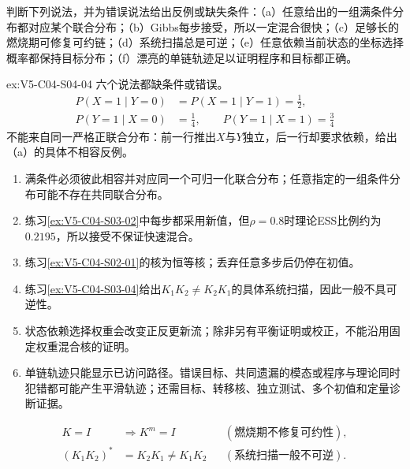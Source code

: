 \begin{SLChapterExercisePairSection}
\begin{exercise}\label{ex:V5-C04-S04-04}
判断下列说法，并为错误说法给出反例或缺失条件：（a）任意给出的一组满条件分布都对应某个联合分布；（b）Gibbs每步接受，所以一定混合很快；（c）足够长的燃烧期可修复可约链；（d）系统扫描总是可逆；（e）任意依赖当前状态的坐标选择概率都保持目标分布；（f）漂亮的单链轨迹足以证明程序和目标都正确。
\end{exercise}
\ifSLFullEdition
{}\label{sol:V5-C04-S04-04}
\begin{chapterexercisesolution}{ex:V5-C04-S04-04}
六个说法都缺条件或错误。
\[
\begin{aligned}
P(X=1\mid Y=0)&=P(X=1\mid Y=1)=\frac12,\\
P(Y=1\mid X=0)&=\frac14,\qquad
P(Y=1\mid X=1)=\frac34
\end{aligned}
\]
不能来自同一严格正联合分布：前一行推出$X$与$Y$独立，后一行却要求依赖，给出（a）的具体不相容反例。
\begin{enumerate}[label=(\alph{enumi}),leftmargin=2.4em]
  \item 满条件必须彼此相容并对应同一个可归一化联合分布；任意指定的一组条件分布可能不存在共同联合分布。
  \item 练习\ref{ex:V5-C04-S03-02}中每步都采用新值，但$\rho=0.8$时理论ESS比例约为$0.2195$，所以接受不保证快速混合。
  \item 练习\ref{ex:V5-C04-S02-01}的核为恒等核；丢弃任意多步后仍停在初值。
  \item 练习\ref{ex:V5-C04-S03-04}给出$K_1K_2\ne K_2K_1$的具体系统扫描，因此一般不具可逆性。
  \item 状态依赖选择权重会改变正反更新流；除非另有平衡证明或校正，不能沿用固定权重混合核的证明。
  \item 单链轨迹只能显示已访问路径。错误目标、共同遗漏的模态或程序与理论同时犯错都可能产生平滑轨迹；还需目标、转移核、独立测试、多个初值和定量诊断证据。
\end{enumerate}
\[
\begin{aligned}
K=I&\Longrightarrow K^m=I
  &&(\text{燃烧期不修复可约性}),\\
(K_1K_2)^*&=K_2K_1\ne K_1K_2
  &&(\text{系统扫描一般不可逆}).
\end{aligned}
\]
\end{chapterexercisesolution}
\fi

\end{SLChapterExercisePairSection}
